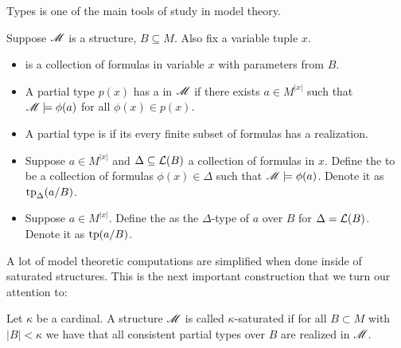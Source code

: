 Types is one of the main tools of study in model theory.
\begin{Definition}
  Suppose $\mathscr M$ is a structure, $B \subseteq M$.
  Also fix a variable tuple $x$.
  \begin{itemize}
  \item {} is a collection of formulas in variable $x$ with parameters from $B$.
  \item A partial type $p(x)$ has a  in $\mathscr M$ if there exists $a \in M^{|x|}$ such that
    $\mathscr M \models \phi(a)$ for all $\phi(x) \in p(x)$.
  \item A partial type is  if its every finite subset of formulas has a realization.
  \item Suppose $a \in M^{|x|}$ and $\Delta \subseteq \mathcal L(B)$ a collection of formulas in $x$.
    Define the  to be a collection of formulas $\phi(x) \in \Delta$
    such that $\mathscr M \models \phi(a)$.
    Denote it as $\operatorname{tp}_{\Delta}(a/B)$.
  \item Suppose $a \in M^{|x|}$.
    Define the  as the $\Delta$-type of $a$ over $B$ for $\Delta = \mathcal L(B)$.
    Denote it as $\operatorname{tp}(a/B)$.
  \end{itemize}
\end{Definition}

A lot of model theoretic computations are simplified when done inside of saturated structures.
This is the next important construction that we turn our attention to:
\begin{Definition}
  Let $\kappa$ be a cardinal.
  A structure $\mathscr M$ is called $\kappa$-saturated if for all $B \subset M$ with $|B| < \kappa$
  we have that all consistent partial types over $B$ are realized in $\mathscr M$.
\end{Definition}

